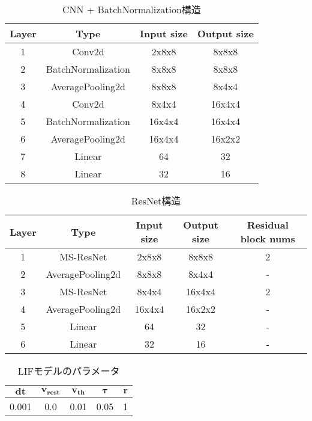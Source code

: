 \begin{table}[htbp]
    \centering
    \caption{CNN + BatchNormalization構造}
    \label{tab:model:parameter:cnn:batchnormalization}
    \begin{tabular}{cccc}
        \hline
        \textbf{Layer}& \textbf{Type}&\textbf{Input size} & \textbf{Output size}\\
        \hline
        1   & Conv2d & 2x8x8 & 8x8x8 \\
        2 & BatchNormalization & 8x8x8 & 8x8x8 \\
        3 & AveragePooling2d & 8x8x8 & 8x4x4 \\
        4 & Conv2d & 8x4x4 & 16x4x4 \\
        5 & BatchNormalization & 16x4x4 & 16x4x4 \\
        6 & AveragePooling2d & 16x4x4 & 16x2x2 \\
        7 & Linear & 64 & 32 \\
        8 & Linear & 32 & 16 \\
        \hline
    \end{tabular}
\end{table}


\begin{table}[htbp]
    \centering
    \caption{ResNet構造}
    \label{tab:model:parameter:resnet}
    \begin{tabular}{ccccc}
        \hline
        \textbf{Layer}& \textbf{Type}&\textbf{Input size} & \textbf{Output size} & \textbf{Residual block nums}\\
        \hline
        1   & MS-ResNet & 2x8x8 & 8x8x8 & 2\\
        2 & AveragePooling2d & 8x8x8 & 8x4x4 & - \\
        3 & MS-ResNet & 8x4x4 & 16x4x4 & 2\\
        4 & AveragePooling2d & 16x4x4 & 16x2x2 & - \\
        5 & Linear & 64 & 32 & - \\
        6 & Linear & 32 & 16 & - \\
        \hline
    \end{tabular}
\end{table}


\begin{table}[htbp]
    \centering
    \caption{LIFモデルのパラメータ}
    \label{tab:model:parameter:lif}
    \begin{tabular}{ccccc}
        \hline
        $\bm{dt}$& $\bm{v_{rest}}$ & $\bm{v_{th}}$ & $\bm{\tau}$ & $\bm{r}$\\
        \hline
        0.001   & 0.0 & 0.01 & 0.05 & 1 \\
        \hline
    \end{tabular}
\end{table}